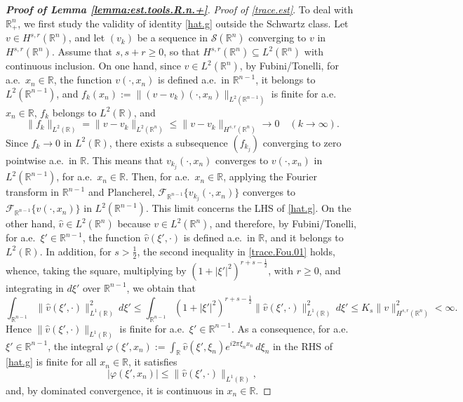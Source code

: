 \documentclass[10pt,reqno,a4paper]{article}
\numberwithin{equation}{section}
\theoremstyle{plain}
\theoremstyle{definition}
\newcommand{\R}{{\mathbb R}}
\newcommand{\mF}{\mathcal{F}}
\newcommand{\mS}{\mathcal{S}}
\newcommand{\ph}{\varphi}
\begin{document}
\begin{proof}[\textbf{Proof of Lemma \ref{lemma:est.tools.R.n.+}}]
\emph{Proof of \eqref{trace.est}}. 
To deal with $\R^n_+$, we first study the validity of identity \eqref{hat.g} outside the Schwartz class. 
Let $v \in H^{s,r}(\R^n)$, and let $(v_k)$ be a sequence in $\mS(\R^n)$ converging to $v$ in $H^{s,r}(\R^n)$. 
Assume that $s, s+r \geq 0$, so that $H^{s,r}(\R^n) \subseteq L^2(\R^n)$ with continuous inclusion. 
On one hand, since $v \in L^2(\R^n)$, by Fubini/Tonelli, 
for a.e.\ $x_n \in \R$, the function $v(\cdot, x_n)$ is defined a.e.\ in $\R^{n-1}$, 
it belongs to $L^2(\R^{n-1})$, and $f_k(x_n) := \| (v-v_k)(\cdot,x_n) \|_{L^2(\R^{n-1})}$ 
is finite for a.e.\ $x_n \in \R$, $f_k$ belongs to $L^2(\R)$, and 
\[
\| f_k \|_{L^2(\R)} = \| v-v_k \|_{L^2(\R^n)} 
\leq \| v-v_k \|_{H^{s,r}(\R^n)} \to 0 \quad (k \to \infty).
\]
Since $f_k \to 0$ in $L^2(\R)$, there exists a subsequence $(f_{k_j})$ 
converging to zero pointwise a.e.\ in $\R$. 
This means that $v_{k_j}(\cdot, x_n)$ converges to $v(\cdot,x_n)$ in $L^2(\R^{n-1})$, for a.e.\ $x_n \in \R$.
Then, for a.e.\ $x_n \in \R$, applying the Fourier transform in $\R^{n-1}$ and Plancherel, 
$\mF_{\R^{n-1}} \{ v_{k_j}(\cdot, x_n) \}$ converges to 
$\mF_{\R^{n-1}} \{ v(\cdot, x_n) \}$ in $L^2(\R^{n-1})$. 
This limit concerns the LHS of \eqref{hat.g}. 
On the other hand, $\hat v \in L^2(\R^n)$ because $v \in L^2(\R^n)$, 
and therefore, by Fubini/Tonelli, for a.e.\ $\xi' \in \R^{n-1}$, 
the function $\hat v(\xi', \cdot)$ is defined a.e.\ in $\R$, 
and it belongs to $L^2(\R)$. 
In addition, for $s > \frac12$, the second inequality in \eqref{trace.Fou.01} holds, 
whence, taking the square, multiplying by $(1+|\xi'|^2)^{r+s-\frac12}$, with $r \geq 0$, 
and integrating in $d \xi'$ over $\R^{n-1}$, we obtain that 
\begin{equation} \label{trace.Fou.03}
\int_{\R^{n-1}} \| \hat v(\xi', \cdot) \|_{L^1(\R)}^2 \, d\xi' 
\leq \int_{\R^{n-1}} (1+|\xi'|^2)^{r+s-\frac12} \| \hat v(\xi', \cdot) \|_{L^1(\R)}^2 \, d\xi' 
\leq K_s \| v \|_{H^{s,r}(\R^n)}^2 
< \infty.
\end{equation}
Hence $\| \hat v(\xi', \cdot) \|_{L^1(\R)}$ is finite for a.e.\ $\xi' \in \R^{n-1}$.  
As a consequence, for a.e.\ $\xi' \in \R^{n-1}$, 
the integral $\ph(\xi', x_n) := \int_{\R} \hat v(\xi', \xi_n) e^{i 2\pi \xi_n x_n} \, d\xi_n$
in the RHS of \eqref{hat.g} is finite for all $x_n \in \R$, it satisfies 
\begin{equation} \label{trace.Fou.05}
|\ph(\xi',x_n)| \leq \| \hat v(\xi', \cdot) \|_{L^1(\R)},
\end{equation} 
and, by dominated convergence, it is continuous in $x_n \in \R$.

\end{proof}
\end{document}
